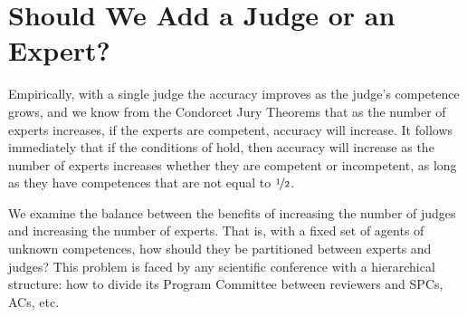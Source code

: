\documentclass[letterpaper]{article} %
\begin{document}
\section{Should We Add a Judge or an Expert?}
Empirically, with a single judge the accuracy improves as the judge's competence grows, and we know from the Condorcet Jury Theorems that as the number of experts increases, if the experts are competent, accuracy will increase.
%
It follows immediately that if the conditions of  hold, then accuracy will increase as the number of experts increases whether they are competent or incompetent, as long as they have competences that are not equal to $\nicefrac{1}{2}$.

We examine the balance between the benefits of increasing the number of judges and increasing the number of experts. That is, with a fixed set of agents of unknown competences, how should they be partitioned between experts and judges? This problem is faced by any scientific conference with a hierarchical structure: how to divide its Program Committee between reviewers and SPCs, ACs, etc.
\end{document}
